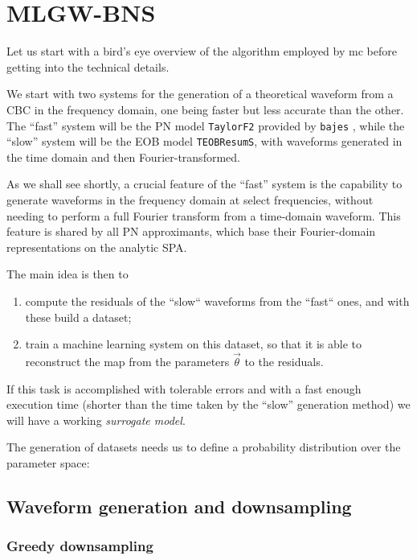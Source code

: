 \documentclass[main.tex]{subfiles}
\begin{document}
\section{MLGW-BNS}

Let us start with a bird's eye overview of the algorithm employed by \ac{mc} before getting into the technical details. 

We start with two systems for the generation of a theoretical waveform from a \ac{CBC} in the frequency domain, one being faster but less accurate than the other. 
The ``fast'' system will be the \ac{PN} model \texttt{TaylorF2} provided by \texttt{bajes} \cite[]{breschiTtBajesBayesian2021}, while the ``slow'' system will be the \ac{EOB} model \texttt{TEOBResumS}, with waveforms generated in the time domain and then Fourier-transformed. 

As we shall see shortly, a crucial feature of the ``fast'' system is the capability to generate waveforms in the frequency domain at select frequencies, without needing to perform a full Fourier transform from a time-domain waveform.
This feature is shared by all \ac{PN} approximants, which base their Fourier-domain representations on the analytic \ac{SPA}.

The main idea is then to 
\begin{enumerate}
    \item compute the residuals of the ``slow`` waveforms from the ``fast`` ones, and with these build a dataset;
    \item train a machine learning system on this dataset, so that it is able to reconstruct the map from the parameters \(\vec{\theta}\) to the residuals.
\end{enumerate}

If this task is accomplished with tolerable errors and with a fast enough execution time (shorter than the time taken by the ``slow'' generation method) we will have a working \emph{surrogate model}. 

The generation of datasets needs us to define a probability distribution over the parameter space: 

\subsection{Waveform generation and downsampling}

\subsubsection{Greedy downsampling}
\end{document}
